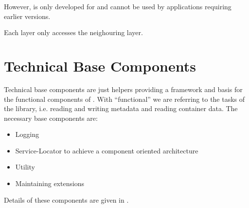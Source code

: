 However, \LibName{} is only developed for \JavaVersion{} and cannot be used by applications requiring earlier versions.

Each layer only accesses the neighouring layer.


\section{Technical Base Components}
\label{sec:TechnicalBasis}

Technical base components are just helpers providing a framework and basis for the functional components of \LibName{}. With ``functional'' we are referring to the tasks of the library, i.e. reading and writing metadata and reading container data. The necessary base components are:
\begin{itemize}
	\item Logging
	\item Service-Locator to achieve a component oriented architecture
	\item Utility
	\item Maintaining extensions
\end{itemize}

Details of these components are given in .

%
%
